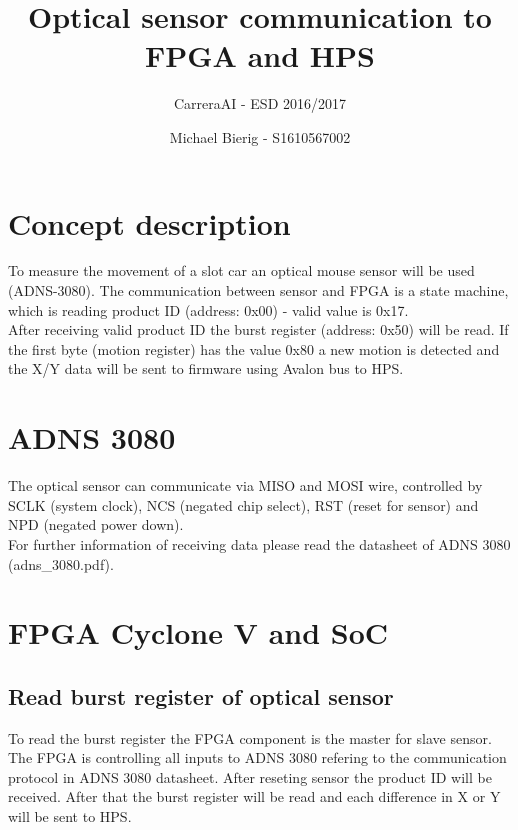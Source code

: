 

\title{Optical sensor communication to FPGA and HPS} %
\subtitle {CarreraAI - ESD 2016/2017} %
\author{Michael Bierig - S1610567002} %
\date{}
\maketitle %


\newpage
\tableofcontents %
\newpage

\section{Concept description}
To measure the movement of a slot car an optical mouse sensor will be used (ADNS-3080).
The communication between sensor and FPGA is a state machine, which is reading product ID (address: 0x00) - valid value is 0x17.\\
After receiving valid product ID the burst register (address: 0x50) will be read. If the first byte (motion register) has the value 0x80 a new motion is detected and the X/Y data will be sent to firmware using Avalon bus to HPS.

 
\section{ADNS 3080}
The optical sensor can communicate via MISO and MOSI wire, controlled by SCLK (system clock), NCS (negated chip select), RST (reset for sensor) and NPD (negated power down).\\
For further information of receiving data please read the datasheet of ADNS 3080 (adns\_3080.pdf).

\section{FPGA Cyclone V and SoC}
\subsection{Read burst register of optical sensor}
To read the burst register the FPGA component is the master for slave sensor. The FPGA is controlling all inputs to ADNS 3080 refering to the communication protocol in ADNS 3080 datasheet. After reseting sensor the product ID will be received. After that the burst register will be read and each difference in X or Y will be sent to HPS.

